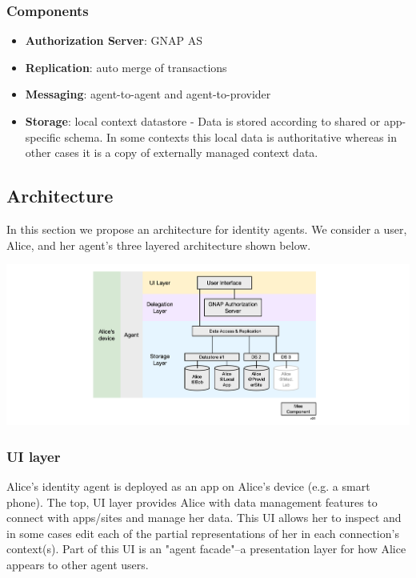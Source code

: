 \documentclass[11pt, oneside]{article}   	%
\begin{document}
\subsubsection{Components}

\begin{itemize}
\item \textbf{Authorization Server}: GNAP AS
\item \textbf{Replication}: auto merge of transactions
\item \textbf{Messaging}: agent-to-agent and agent-to-provider
\item \textbf{Storage}: local context datastore - Data is stored according to shared or app-specific schema. In some contexts this local data is authoritative whereas in other cases it is a copy of externally managed context data.  
\end{itemize}

\subsection{Architecture}

In this section we propose an architecture for identity agents. We consider a user, Alice, and her agent's three layered architecture shown below.

\includegraphics[width=\textwidth]{./images/architecture.png}

\subsubsection{UI layer}

Alice's identity agent is deployed as an app on Alice's device (e.g. a smart phone). The top, UI layer provides Alice with data management features to connect with apps/sites and manage her data. This UI allows her to inspect and in some cases edit each of the partial representations of her in each connection's context(s). Part of this UI is an "agent facade"--a presentation layer for how Alice appears to other agent users. 
\end{document}
